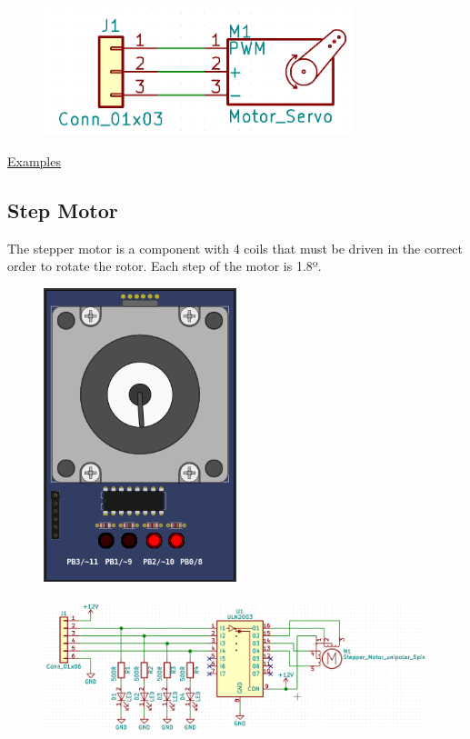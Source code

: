 \begin{figure}[H]
\center
\includegraphics[width=0.8\textwidth]{img/part_servo_.png} 
\end{figure} 

\href{https://lcgamboa.github.io/picsimlab_examples/Parts.html\#Servo_Motor}{Examples}


\subsection{Step Motor}

The stepper motor is a component with 4 coils that must be driven in the correct order to rotate the rotor.
Each step of the motor is 1.8º.

\begin{figure}[H]
\center
\includegraphics[width=0.5\textwidth]{img/part_step.png} 
\end{figure} 

\begin{figure}[H]
\center
\includegraphics[width=0.99\textwidth]{img/part_step_.png} 
\end{figure} 


